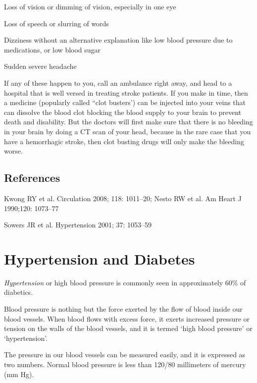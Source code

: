 { \item Loss of vision or dimming of vision, especially in one eye

 \item Loss of speech or slurring of words

 \item Dizziness without an alternative explanation like low blood pressure due to medications, or low blood sugar

 \item Sudden severe headache

If any of these happen to you, call an ambulance right away, and head to a hospital that is well versed in treating stroke patients. If you make in time, then a medicine (popularly called “clot busters’) can be injected into your veins that can dissolve the blood clot blocking the blood supply to your brain to prevent death and disability. But the doctors will first make sure that there is no bleeding in your brain by doing a CT scan of your head, because in the rare case that you have a hemorrhagic stroke, then clot busting drugs will only make the bleeding worse.

\section*{References}

\begin{thebibliography}{99}
 Kwong RY et al. Circulation 2008; 118: 1011–20; Nesto RW et al. Am Heart J 1990;120: 1073–77

  Sowers JR et al. Hypertension 2001; 37: 1053–59

 \end{thebibliography}


\chapter{Hypertension and Diabetes}\label{chap13A}

\textit{Hypertension} or high blood pressure is commonly seen in approximately 60\% of diabetics.

Blood pressure is nothing but the force exerted by the flow of blood inside our blood vessels. When blood flows with excess force, it exerts increased pressure or tension on the walls of the blood vessels, and it is termed ‘high blood pressure’ or ‘hypertension’.

The pressure in our blood vessels can be measured easily, and it is expressed as two numbers. Normal blood pressure is less than 120/80 millimeters of mercury (mm Hg).

}
